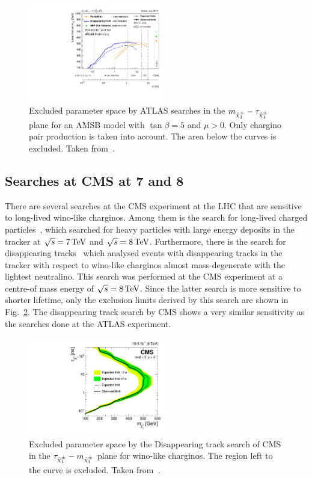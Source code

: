 \begin{figure}[!b]
  \centering
      \includegraphics[width=0.54\textwidth]{figures/theory/ATLAS_SUSY_LLPChargino.pdf}
  \caption{Excluded parameter space by ATLAS searches in the $m_{\tilde{\chi}^{\pm}_{1}}-\tau_{\tilde{\chi}^{\pm}_{1}}$ plane for an AMSB model with $\tan\beta=5$ and $\mu>0$. Only chargino pair production is taken into account. The area below the curves is excluded. Taken from~\cite{bib:ATLAS_SUMMARYPLOTS}.}  
  \label{fig:ATLAS}
\end{figure}

\subsection*{Searches at CMS at 7 and 8\tev}
There are several searches at the CMS experiment at the LHC that are sensitive to long-lived wino-like charginos.
Among them is the search for long-lived charged particles~\cite{bib:CMS:HSCP_8TeV}, which searched for heavy particles with large energy deposits in the tracker at $\sqrt{s}=7\,\text{Te}\kern-0.06667em\text{V}$  and $\sqrt{s}=8\,\text{Te}\kern-0.06667em\text{V}$.
Furthermore, there is the search for disappearing tracks~\cite{bib:CMS:DT_8TeV} which analysed events with disappearing tracks in the tracker with respect to wino-like charginos almost mass-degenerate with the lightest neutralino.
This search was performed at the CMS experiment at a centre-of mass energy of $\sqrt{s}=8\,\text{Te}\kern-0.06667em\text{V}$.
Since the latter search is more sensitive to shorter lifetime, only the exclusion limits derived by this search are shown in Fig.~\ref{fig:CMS}.
The disappearing track search by CMS shows a very similar sensitivity as the searches done at the ATLAS experiment.
\vspace{0.8cm}
\begin{figure}[!h]
  \centering
      \includegraphics[width=0.54\textwidth]{figures/theory/lifetimeNs_vs_mass.pdf}
  \caption{Excluded parameter space by the Disappearing track search of CMS in the $\tau_{\tilde{\chi}^{\pm}_{1}}-m_{\tilde{\chi}^{\pm}_{1}}$ plane for wino-like charginos. The region left to the curve is excluded. Taken from~\cite{bib:CMS:DT_8TeV}.}  
  \label{fig:CMS}
\end{figure}

